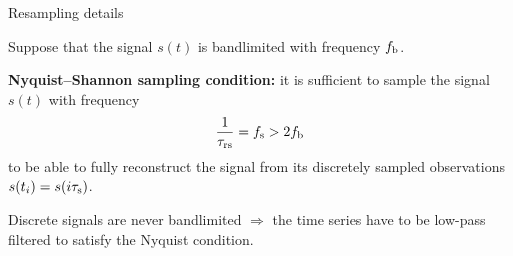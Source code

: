 \documentclass{beamer}
\begin{document}
\begin{frame}{Resampling details}

Suppose that the signal $s(t)$ is bandlimited with frequency $f_{\text{b}}$.

\bigskip

\textbf{Nyquist–Shannon  sampling condition:} it is sufficient to sample the signal $s(t)$ with frequency
\[ \frac{1}{\tau_{\text{rs}}} = f_{\text{s}} > 2f_{\text{b}}\]
to be able to fully reconstruct the signal from its discretely sampled observations $s(t_i) = s(i\tau_{\text{s}})$.

\bigskip

%

Discrete signals are never bandlimited %
$\Rightarrow$ the time series have to be low-pass filtered to satisfy the Nyquist condition.


\end{frame}
\end{document}
